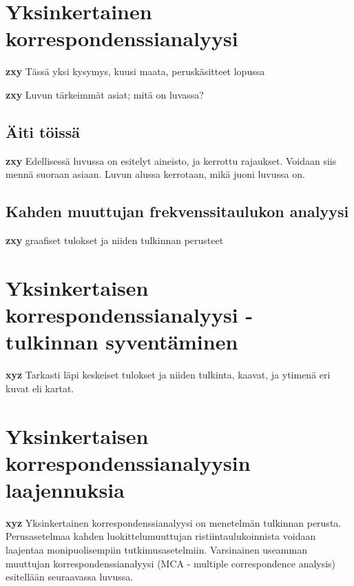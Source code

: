 \documentclass[
  finnish,
]{book}
\begin{document}
\hypertarget{yksinkertainen-korrespondenssianalyysi}{%
\chapter{Yksinkertainen korrespondenssianalyysi}\label{yksinkertainen-korrespondenssianalyysi}}

\textbf{zxy} Tässä yksi kysymys, kuusi maata, peruskäsitteet lopussa

\textbf{zxy} Luvun tärkeimmät asiat; mitä on luvassa?

\hypertarget{uxe4iti-tuxf6issuxe4}{%
\section{Äiti töissä}\label{uxe4iti-tuxf6issuxe4}}

\textbf{zxy} Edellisessä luvussa on esitelyt aineisto, ja kerrottu rajaukset. Voidaan siis mennä suoraan asiaan. Luvun alussa kerrotaan, mikä juoni luvussa on.

\hypertarget{kahden-muuttujan-frekvenssitaulukon-analyysi}{%
\section{Kahden muuttujan frekvenssitaulukon analyysi}\label{kahden-muuttujan-frekvenssitaulukon-analyysi}}

\textbf{zxy} graafiset tulokset ja niiden tulkinnan perusteet

\hypertarget{yksinkertaisen-korrespondenssianalyysi---tulkinnan-syventuxe4minen}{%
\chapter{Yksinkertaisen korrespondenssianalyysi - tulkinnan syventäminen}\label{yksinkertaisen-korrespondenssianalyysi---tulkinnan-syventuxe4minen}}

\textbf{xyz} Tarkasti läpi keskeiset tulokset ja niiden tulkinta, kaavat, ja ytimenä eri kuvat eli kartat.

\hypertarget{yksinkertaisen-korrespondenssianalyysin-laajennuksia}{%
\chapter{Yksinkertaisen korrespondenssianalyysin laajennuksia}\label{yksinkertaisen-korrespondenssianalyysin-laajennuksia}}

\textbf{xyz} Yksinkertainen korrespondenssianalyysi on menetelmän tulkinnan perusta. Perusasetelmaa kahden luokittelumuuttujan ristiintaulukoinnista voidaan laajentaa monipuolisempiin tutkimusasetelmiin. Varsinainen useamman muuttujan korrespondenssianalyysi (MCA - multiple correspondence analysis) esitellään seuraavassa luvussa.
\end{document}
